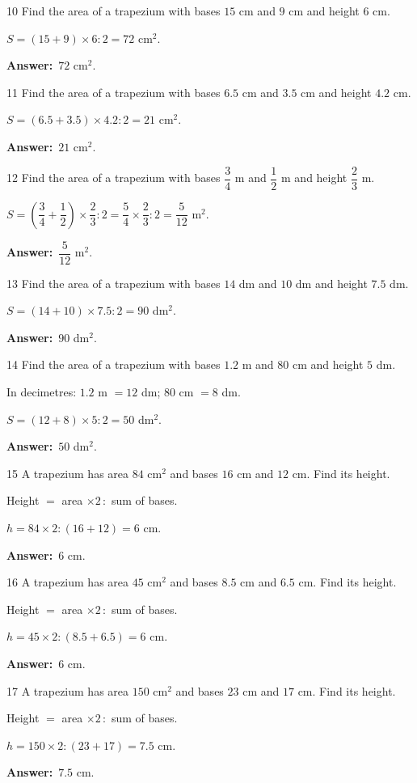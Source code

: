\documentclass[11pt]{article}
\newif\ifsol \solfalse
\providecommand{\AnsWord}{Đáp số}
\newcommand{\dapso}[1]{\par\textbf{\AnsWord:}\ #1}
\newcommand{\probsol}[1]{%
  \begin{lrbox}{\solmeasure}\begin{minipage}{\dimexpr\linewidth-24pt\relax}#1\end{minipage}\end{lrbox}%
  \ifsol
    \begin{solbox}#1\end{solbox}%
  \else
    \setlength{\solht}{\dimexpr\ht\solmeasure+\dp\solmeasure+0.85cm\relax}%
    \ifdim\solht<1.35cm\setlength{\solht}{1.35cm}\fi
    \begin{tcolorbox}[colback=white,colframe=Line,boxrule=0.8pt,arc=5pt,
      left=8pt,right=8pt,top=4pt,bottom=4pt,height=\solht]{\footnotesize\color{Slate}\itshape\WorkWord}\end{tcolorbox}%
  \fi}
\newcommand{\gap}{\vspace{0.3cm}}
\def\WorkWord{Your work:}
\def\AnsWord{Answer}
\begin{document}
\gap
\begin{probbox}{10}{\relax}
Find the area of a trapezium with bases $15$ cm and $9$ cm and height $6$ cm.
\end{probbox}
\probsol{
$S=(15+9)\times6:2=72$ cm$^2$.
\dapso{$72$ cm$^2$.}}
\gap
\begin{probbox}{11}{\relax}
Find the area of a trapezium with bases $6.5$ cm and $3.5$ cm and height $4.2$ cm.
\end{probbox}
\probsol{
$S=(6.5+3.5)\times4.2:2=21$ cm$^2$.
\dapso{$21$ cm$^2$.}}
\gap
\begin{probbox}{12}{\relax}
Find the area of a trapezium with bases $\dfrac34$ m and $\dfrac12$ m and height $\dfrac23$ m.
\end{probbox}
\probsol{
$S=\left(\dfrac34+\dfrac12\right)\times\dfrac23:2=\dfrac54\times\dfrac23:2=\dfrac5{12}$ m$^2$.
\dapso{$\dfrac5{12}$ m$^2$.}}
\gap
\begin{probbox}{13}{\relax}
Find the area of a trapezium with bases $14$ dm and $10$ dm and height $7.5$ dm.
\end{probbox}
\probsol{
$S=(14+10)\times7.5:2=90$ dm$^2$.
\dapso{$90$ dm$^2$.}}
\gap
\begin{probbox}{14}{\relax}
Find the area of a trapezium with bases $1.2$ m and $80$ cm and height $5$ dm.
\end{probbox}
\probsol{
In decimetres: $1.2$ m $=12$ dm; $80$ cm $=8$ dm.\par $S=(12+8)\times5:2=50$ dm$^2$.
\dapso{$50$ dm$^2$.}}
\gap
\begin{probbox}{15}{\relax}
A trapezium has area $84$ cm$^2$ and bases $16$ cm and $12$ cm. Find its height.
\end{probbox}
\probsol{
Height $=$ area $\times2\,:$ sum of bases.\par $h=84\times2:(16+12)=6$ cm.
\dapso{$6$ cm.}}
\gap
\begin{probbox}{16}{\relax}
A trapezium has area $45$ cm$^2$ and bases $8.5$ cm and $6.5$ cm. Find its height.
\end{probbox}
\probsol{
Height $=$ area $\times2\,:$ sum of bases.\par $h=45\times2:(8.5+6.5)=6$ cm.
\dapso{$6$ cm.}}
\gap
\begin{probbox}{17}{\relax}
A trapezium has area $150$ cm$^2$ and bases $23$ cm and $17$ cm. Find its height.
\end{probbox}
\probsol{
Height $=$ area $\times2\,:$ sum of bases.\par $h=150\times2:(23+17)=7.5$ cm.
\dapso{$7.5$ cm.}}
\end{document}
